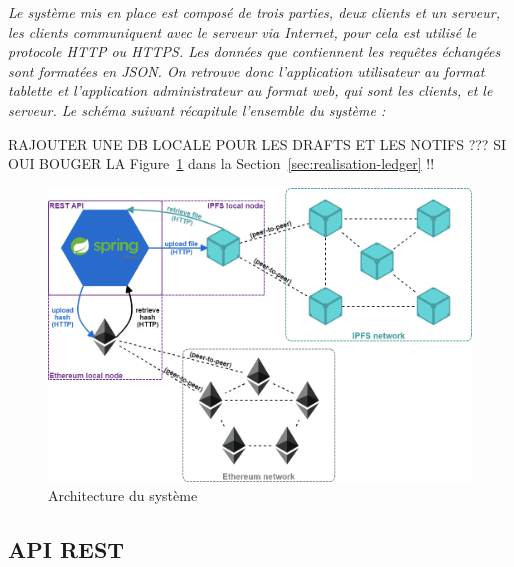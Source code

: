 \documentclass{tnreport}
\begin{document}
{\em
	Le système mis en place est composé de trois parties, deux clients et un serveur, les clients
	communiquent avec le serveur via Internet, pour cela est utilisé le protocole HTTP ou HTTPS. Les
	données que contiennent les requêtes échangées sont formatées en JSON. On retrouve donc l'application utilisateur au format tablette et l'application administrateur au format web, qui sont les clients, et le serveur. Le schéma suivant récapitule l'ensemble du système :
}

RAJOUTER UNE DB LOCALE POUR LES DRAFTS ET LES NOTIFS ???
SI OUI BOUGER LA Figure~\ref{fig:architecture} dans la Section~\ref{sec:realisation-ledger} !!

\begin{figure}[h]
	\centering
	\includegraphics[scale=0.45]{figures/architecture}
	\caption{Architecture du système}
	\label{fig:architecture}
\end{figure}

\subsection{API REST}
\end{document}
